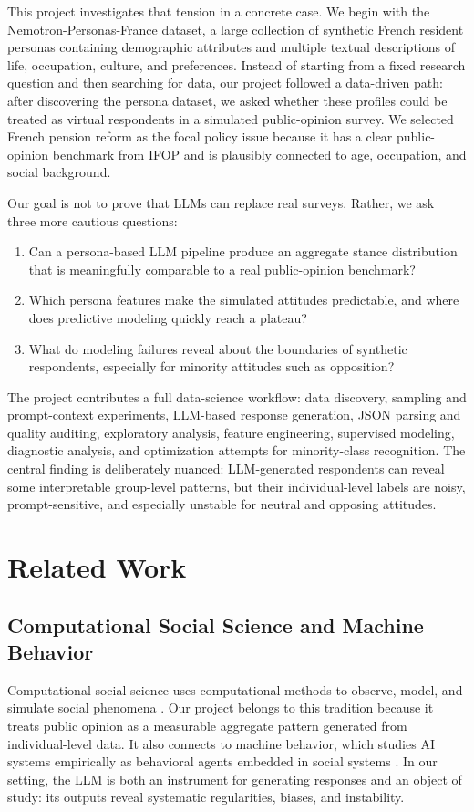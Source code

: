 ﻿\documentclass[10pt,twocolumn]{article}
\newcommand{\dataset}{Nemotron-Personas-France}
\newcommand{\ifop}{IFOP}
\begin{document}
This project investigates that tension in a concrete case. We begin with the \dataset{} dataset, a large collection of synthetic French resident personas containing demographic attributes and multiple textual descriptions of life, occupation, culture, and preferences. Instead of starting from a fixed research question and then searching for data, our project followed a data-driven path: after discovering the persona dataset, we asked whether these profiles could be treated as virtual respondents in a simulated public-opinion survey. We selected French pension reform as the focal policy issue because it has a clear public-opinion benchmark from \ifop{} and is plausibly connected to age, occupation, and social background.

Our goal is not to prove that LLMs can replace real surveys. Rather, we ask three more cautious questions:

\begin{enumerate}[leftmargin=*]
  \item Can a persona-based LLM pipeline produce an aggregate stance distribution that is meaningfully comparable to a real public-opinion benchmark?
  \item Which persona features make the simulated attitudes predictable, and where does predictive modeling quickly reach a plateau?
  \item What do modeling failures reveal about the boundaries of synthetic respondents, especially for minority attitudes such as opposition?
\end{enumerate}

The project contributes a full data-science workflow: data discovery, sampling and prompt-context experiments, LLM-based response generation, JSON parsing and quality auditing, exploratory analysis, feature engineering, supervised modeling, diagnostic analysis, and optimization attempts for minority-class recognition. The central finding is deliberately nuanced: LLM-generated respondents can reveal some interpretable group-level patterns, but their individual-level labels are noisy, prompt-sensitive, and especially unstable for neutral and opposing attitudes.

\section{Related Work}
\subsection{Computational Social Science and Machine Behavior}
Computational social science uses computational methods to observe, model, and simulate social phenomena \cite{lazer2009computational}. Our project belongs to this tradition because it treats public opinion as a measurable aggregate pattern generated from individual-level data. It also connects to machine behavior, which studies AI systems empirically as behavioral agents embedded in social systems \cite{rahwan2019machine}. In our setting, the LLM is both an instrument for generating responses and an object of study: its outputs reveal systematic regularities, biases, and instability.
\end{document}

